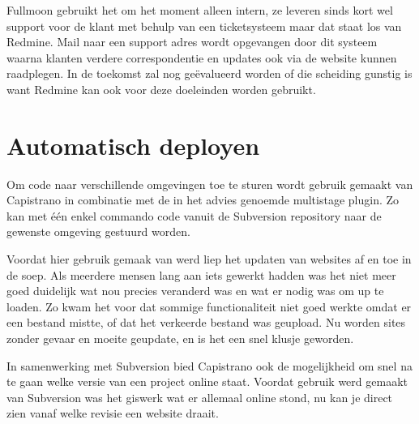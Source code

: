 Fullmoon gebruikt het om het moment alleen intern, ze leveren sinds kort wel support voor de klant met behulp van een ticketsysteem maar dat staat los van Redmine. Mail naar een support adres wordt opgevangen door dit systeem waarna klanten verdere correspondentie en updates ook via de website kunnen raadplegen. In de toekomst zal nog geëvalueerd worden of die scheiding gunstig is want Redmine kan ook voor deze doeleinden worden gebruikt.

\section{Automatisch deployen}

Om code naar verschillende omgevingen toe te sturen wordt gebruik gemaakt van Capistrano in combinatie met de in het advies genoemde multistage plugin. Zo kan met één enkel commando code vanuit de Subversion repository naar de gewenste omgeving gestuurd worden.

Voordat hier gebruik gemaak van werd liep het updaten van websites af en toe in de soep. Als meerdere mensen lang aan iets gewerkt hadden was het niet meer goed duidelijk wat nou precies veranderd was en wat er nodig was om up te loaden. Zo kwam het voor dat sommige functionaliteit niet goed werkte omdat er een bestand mistte, of dat het verkeerde bestand was geupload. Nu worden sites zonder gevaar en moeite geupdate, en is het een snel klusje geworden.

In samenwerking met Subversion bied Capistrano ook de mogelijkheid om snel na te gaan welke versie van een project online staat. Voordat gebruik werd gemaakt van Subversion was het giswerk wat er allemaal online stond, nu kan je direct zien vanaf welke revisie een website draait.
